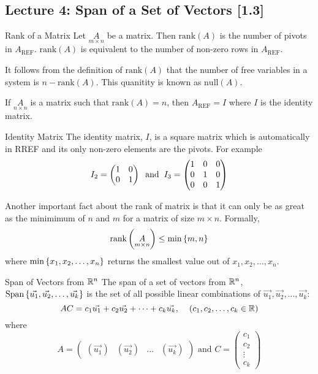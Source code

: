 \subsection{Lecture 4: Span of a Set of Vectors [1.3]}
\begin{defbox}{Rank of a Matrix}{}
    Let $\underset{m \times n}{A}$ be a matrix. Then $\text{rank}(A)$ is the number of pivots in $A_{\text{REF}}$. $\text{rank}(A)$ is equivalent to the number of non-zero rows in $A_{\text{REF}}$. 
\end{defbox}

It follows from the definition of $\text{rank}(A)$ that the number of free variables in a system is $n - \text{rank}(A)$. This quanitity is known as $\text{null}(A)$.

If $\underset{n \times n}{A}$ is a matrix such that $\text{rank}(A) = n$, then $A_{\text{REF}} = I$ where $I$ is the identity matrix.

\begin{defbox}{Identity Matrix}{}
    The identity matrix, $I$, is a square matrix which is automatically in RREF and its only non-zero elements are the pivots. For example
    \[I_2 = \begin{pmatrix}
        1 & 0 \\
        0 & 1
    \end{pmatrix}
    \hspace{0.2cm}
    \text{and}
    \hspace{0.2cm}
    I_3 = \begin{pmatrix}
        1 & 0 & 0 \\
        0 & 1 & 0 \\
        0 & 0 & 1
    \end{pmatrix}\]
\end{defbox}

Another important fact about the rank of matrix is that it can only be as great as the minimimum of $n$ and $m$ for a matrix of size $m \times n$. Formally, 
\[ \text{rank}\left(\underset{m \times n}{A}\right) \leq \min\left\{m, n \right\}\]
where $\min\left\{x_1, x_2, \dots, x_n \right\}$ returns the smallest value out of $x_1, x_2, \dots, x_n$.

\begin{defbox}{Span of Vectors from $\mathbb R^{n}$}{}
    The span of a set of vectors from $\mathbb R^{n}$, $\text{Span}\left\{\vec{u_1}, \vec{u_2}, \dots, \vec{u_k} \right\}$ is the set of all possible linear combinations of $\vec{u_1}, \vec{u_2}, \dots, \vec{u_k}$:
    \[AC = c_1\vec{u_1} + c_2\vec{u_2} + \dots + c_k\vec{u_k}, \hspace{0.4cm}\left(c_1, c_2, \dots, c_k \in \mathbb R \right)\]
    where 
    \[
        A = \begin{pmatrix}
            \left(\vec{u_1}\right) & \left(\vec{u_2}\right) & \dots & \left(\vec{u_k}\right) 
        \end{pmatrix}
        \text{ and } 
        C = \begin{pmatrix}
            c_1 \\ c_2 \\ \vdots \\ c_k 
        \end{pmatrix}
    \]
\end{defbox}

